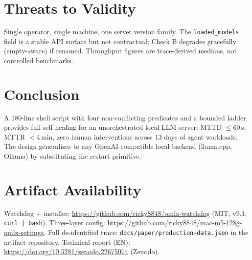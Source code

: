 \documentclass[10pt]{article}
\begin{document}
\section{Threats to Validity}

Single operator, single machine, one server version family. The \texttt{loaded\_models} field is a stable API surface but not contractual; Check B degrades gracefully (empty-aware) if renamed. Throughput figures are trace-derived medians, not controlled benchmarks.

\section{Conclusion}

A 180-line shell script with four non-conflicting predicates and a bounded ladder provides full self-healing for an unorchestrated local LLM server: MTTD $\le 60$\,s, MTTR $<$4\,min, zero human interventions across 13 days of agent workloads. The design generalizes to any OpenAI-compatible local backend (llama.cpp, Ollama) by substituting the restart primitive.

\section*{Artifact Availability}

Watchdog + installer: \url{https://github.com/ricky8848/omlx-watchdog} (MIT, v9.1; \texttt{curl | bash}). Three-layer config: \url{https://github.com/ricky8848/mac-m5-128g-omlx-settings}. Full de-identified trace: \texttt{docs/paper/production-data.json} in the artifact repository. Technical report (EN): \url{https://doi.org/10.5281/zenodo.22675074} (Zenodo).
\end{document}
